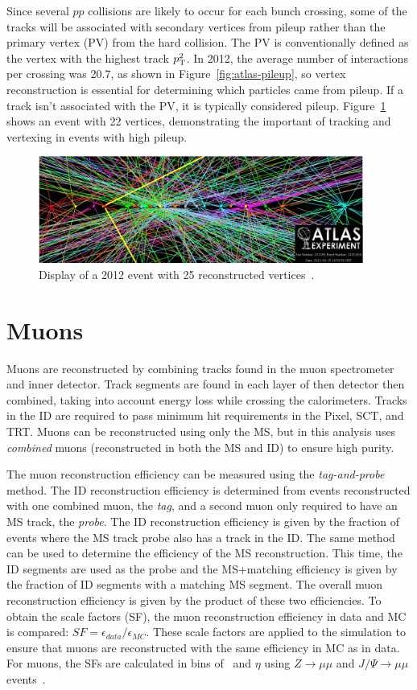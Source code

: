 Since several $pp$ collisions are likely to occur for each bunch crossing, some of the tracks will be associated with secondary vertices from pileup rather than the primary vertex (PV) from the hard collision. The PV is conventionally defined as the vertex with the highest track $p_{\text{T}}^2$. In 2012, the average number of interactions per crossing was 20.7, as shown in Figure~\ref{fig:atlas-pileup}, so vertex reconstruction is essential for determining which particles came from pileup. If a track isn't associated with the PV, it is typically considered pileup. Figure~\ref{fig:disppileup} shows an event with 22 vertices, demonstrating the important of tracking and vertexing in events with high pileup.


\begin{figure}[tp]
  \centering
  \includegraphics[width=0.95\textwidth]{fig/atlas/pileupEvent}
  \caption{Display of a 2012 event with 25 reconstructed vertices~\cite{eventdisp}.}
  \label{fig:disppileup}
\end{figure}

\section{Muons}
Muons are reconstructed by combining tracks found in the muon spectrometer and inner detector. Track segments are found in each layer of then detector then combined, taking into account energy loss while crossing the calorimeters. Tracks in the ID are required to pass minimum hit requirements in the Pixel, SCT, and TRT. Muons can be reconstructed using only the MS, but in this analysis uses \emph{combined} muons (reconstructed in both the MS and ID) to ensure high purity.

The muon reconstruction efficiency can be measured using the \emph{tag-and-probe} method. The ID reconstruction efficiency is determined from events reconstructed with one combined muon, the \emph{tag}, and a second muon only required to have an MS track, the \emph{probe}. The ID reconstruction efficiency is given by the fraction of events where the MS track probe also has a track in the ID. The same method can be used to determine the efficiency of the MS reconstruction. This time, the ID segments are used as the probe and the MS+matching efficiency is given by the fraction of ID segments with a matching MS segment. The overall muon reconstruction efficiency is given by the product of these two efficiencies. To obtain the scale factors (SF), the muon reconstruction efficiency in data and MC is compared: $SF = \epsilon_{data}/\epsilon_{MC}$. These scale factors are applied to the simulation to ensure that muons are reconstructed with the same efficiency in MC as in data. For muons, the SFs are calculated in bins of \pt\ and $\eta$ using $Z\rightarrow \mu\mu$ and $J/\Psi\rightarrow \mu\mu$ events~\cite{muonpaper}. 

